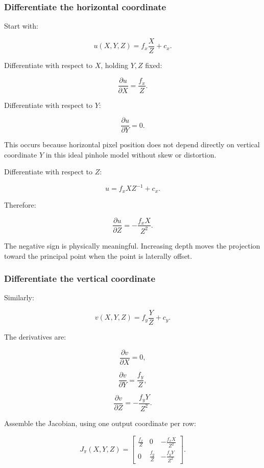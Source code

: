 \subsubsection{Differentiate the horizontal coordinate}\label{02-foundations-ii-ch021-differentiate-the-horizontal-coordinate}

Start with:

\[
u(X,Y,Z)=f_x\frac XZ+c_x.
\]

Differentiate with respect to \(X\), holding \(Y,Z\) fixed:

\[
\boxed{\frac{\partial u}{\partial X}=\frac{f_x}{Z}}.
\]

Differentiate with respect to \(Y\):

\[
\boxed{\frac{\partial u}{\partial Y}=0}.
\]

This occurs because horizontal pixel position does not depend directly on vertical coordinate \(Y\) in this ideal pinhole model without skew or distortion.

Differentiate with respect to \(Z\):

\[
u=f_xXZ^{-1}+c_x.
\]

Therefore:

\[
\boxed{ \frac{\partial u}{\partial Z} =-\frac{f_xX}{Z^2} }.
\]

The negative sign is physically meaningful. Increasing depth moves the projection toward the principal point when the point is laterally offset.

\subsubsection{Differentiate the vertical coordinate}\label{02-foundations-ii-ch021-differentiate-the-vertical-coordinate}

Similarly:

\[
v(X,Y,Z)=f_y\frac YZ+c_y.
\]

The derivatives are:

\[
\frac{\partial v}{\partial X}=0,
\]

\[
\frac{\partial v}{\partial Y}=\frac{f_y}{Z},
\]

\[
\frac{\partial v}{\partial Z}=-\frac{f_yY}{Z^2}.
\]

Assemble the Jacobian, using one output coordinate per row:

\[
\boxed{ J_\pi(X,Y,Z)= \begin{bmatrix} \frac{f_x}{Z}&0&-\frac{f_xX}{Z^2}\\[4pt] 0&\frac{f_y}{Z}&-\frac{f_yY}{Z^2} \end{bmatrix} }.
\]

